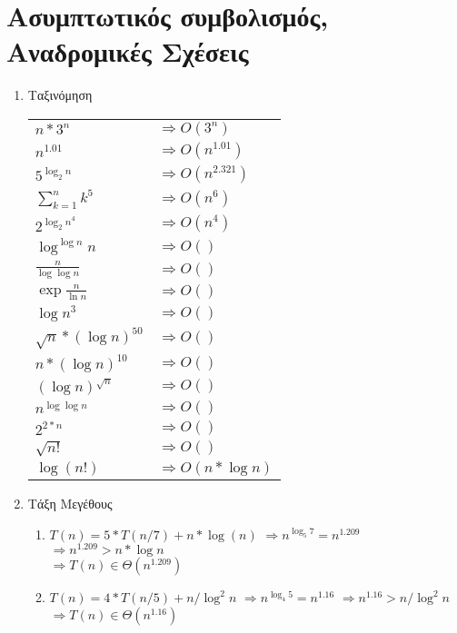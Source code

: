 \documentclass[a4paper,10pt]{article} \usepackage{anysize}
\begin{document}
\renewcommand{\labelenumi}{\alph{enumi}}
\renewcommand{\labelenumii}{(\roman{enumii})}



\section{Ασυμπτωτικός συμβολισμός, Αναδρομικές
Σχέσεις} \setcounter{section}{1}
\begin{enumerate}
\item Ταξινόμηση
\begin{tabular}{l l}
$ n*3^n$ & $\Rightarrow O(3^n)$ \\
$ n^{1.01}$ & $\Rightarrow O(n^{1.01})$\\
$ 5^{\log _2 {n}}$ & $\Rightarrow O(n^{2.321})$\\
$ \sum_{k=1}^{n}k^5$ & $\Rightarrow O(n^6)$\\
$ 2^{{\log _2 {n}}^4}$ & $\Rightarrow O(n^4)$\\
$ {\log^{\log{n}}{n}}$ & $\Rightarrow O()$\\
$ \frac{n}{\log\log{n}}$ & $\Rightarrow O()$\\
$ \exp{\frac{n}{\ln{n}}}$ & $\Rightarrow O()$\\
$ \log{n^3}$ & $\Rightarrow O()$\\
$ \sqrt{n}*(\log{n})^{50}$ & $\Rightarrow O()$\\
$ n*(\log{n})^{10}$ & $\Rightarrow O()$\\
$ (\log{n})^{\sqrt{n}}$ & $\Rightarrow O()$\\
$ n^{\log{\log{n}}}$ & $\Rightarrow O()$\\
$ 2^{2*n}$ & $\Rightarrow O()$\\
$ \sqrt{n!}$ & $\Rightarrow O()$\\
$ \log{(n!)}$ & $\Rightarrow O(n*\log{n})$\\

\end{tabular}

\item Τάξη Μεγέθους
\begin{enumerate}
\item $T(n)=5*T(n/7)+n*\log(n)$
$\Rightarrow n^{\log _5 {7}} = n^{1.209}$
$\Rightarrow n^{1.209} > n*\log{n}$\\
$\Rightarrow T(n) \in \Theta(n^{1.209})$

\item $T(n) = 4*T(n/5)+n/\log^2{n}$
$\Rightarrow n^{\log_4 {5}} = n^{1.16}$
$\Rightarrow n^{1.16} > n/\log^2{n}$\\
$\Rightarrow T(n) \in \Theta(n^{1.16})$


\end{enumerate}
\end{enumerate}
\end{document}
